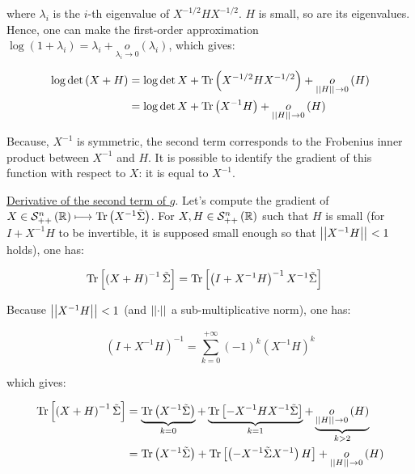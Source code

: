 \documentclass[a4paper, 11pt]{report}
\begin{document}
\begin{enumerate}[label=\alph*]
    where $\lambda_{i}$ is the $i$-th eigenvalue of $X^{-1/2}HX^{-1/2}$. $H$ is small, so are its eigenvalues. Hence, one can make the first-order approximation $\log \left( 1 + \lambda_{i} \right) = \lambda_{i} + \underset{\lambda_{i} \rightarrow 0}{o} \left( \lambda_{i} \right)$, which gives:
    
    \begin{equation*}
        \begin{aligned}
        \log \det \left( X + H \right) &= \log \det X + \operatorname{Tr} \left( X^{-1/2}HX^{-1/2} \right) + \underset{\left|\left| H \right|\right|_{} \rightarrow 0}{o} \left( H \right) \\
        &= \log \det X + \operatorname{Tr} \left( X^{-1} H \right) + \underset{\left|\left| H \right|\right|_{} \rightarrow 0}{o} \left( H \right)
        \end{aligned}
    \end{equation*}
    
    Because, $X^{-1}$ is symmetric, the second term corresponds to the Frobenius inner product between $X^{-1}$ and $H$. It is possible to identify the gradient of this function with respect to $X$: it is equal to $X^{-1}$.
    
    \underline{Derivative of the second term of $g$}. Let's compute the gradient of $X \in \mathcal{S}_{++}^{n} \left( \mathbb{R} \right) \longmapsto \operatorname{Tr} \left( X^{-1} \Tilde{\Sigma} \right)$. For $X, H \in \mathcal{S}_{++}^{n} \left( \mathbb{R} \right)$ such that $H$ is small (for $I + X^{-1}H$ to be invertible, it is supposed small enough so that $\left|\left| X^{-1}H \right|\right|_{} < 1$ holds), one has:
    
    \begin{equation*}
        \begin{aligned}
        \operatorname{Tr} \left[ \left( X + H \right)^{-1} \Tilde{\Sigma} \right] &= \operatorname{Tr} \left[ \left( I + X^{-1}H \right)^{-1} X^{-1} \Tilde{\Sigma} \right]
        \end{aligned}
    \end{equation*}
    
    Because $\left|\left| X^{-1}H \right|\right|_{} < 1$ (and $\left|\left| \cdot \right|\right|_{}$ a sub-multiplicative norm), one has:
    
    \begin{equation*}
        \left( I + X^{-1}H \right)^{-1} = \sum_{k=0}^{+ \infty} \left( -1 \right)^{k} \left( X^{-1}H \right)^{k}
    \end{equation*}
    
    which gives:
    
    \begin{equation*}
        \begin{aligned}
        \operatorname{Tr} \left[ \left( X + H \right)^{-1} \Tilde{\Sigma} \right] &= \underbrace{\operatorname{Tr} \left( X^{-1}\Tilde{\Sigma} \right)}_{k=0} + \underbrace{\operatorname{Tr} \left[ - X^{-1}HX^{-1} \Tilde{\Sigma} \right]}_{k=1} + \underbrace{\underset{\left|\left| H \right|\right|_{} \rightarrow 0}{o} \left( H \right)}_{k > 2} \\
        &= \operatorname{Tr} \left( X^{-1}\Tilde{\Sigma} \right) + \operatorname{Tr} \left[ \left( - X^{-1}\Tilde{\Sigma}X^{-1} \right) H \right] + \underset{\left|\left| H \right|\right|_{} \rightarrow 0}{o} \left( H \right)
        \end{aligned}
    \end{equation*}
    

\end{enumerate}
\end{document}

